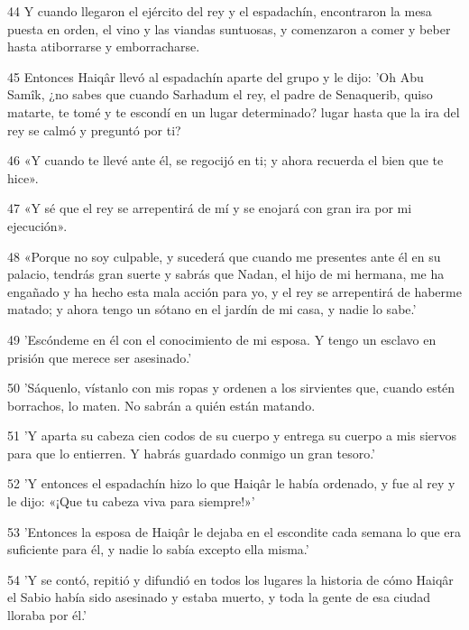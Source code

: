 \par 44 Y cuando llegaron el ejército del rey y el espadachín, encontraron la mesa puesta en orden, el vino y las viandas suntuosas, y comenzaron a comer y beber hasta atiborrarse y emborracharse.

\par 45 Entonces Haiqâr llevó al espadachín aparte del grupo y le dijo: 'Oh Abu Samîk, ¿no sabes que cuando Sarhadum el rey, el padre de Senaquerib, quiso matarte, te tomé y te escondí en un lugar determinado? lugar hasta que la ira del rey se calmó y preguntó por ti?

\par 46 «Y cuando te llevé ante él, se regocijó en ti; y ahora recuerda el bien que te hice».

\par 47 «Y sé que el rey se arrepentirá de mí y se enojará con gran ira por mi ejecución».

\par 48 «Porque no soy culpable, y sucederá que cuando me presentes ante él en su palacio, tendrás gran suerte y sabrás que Nadan, el hijo de mi hermana, me ha engañado y ha hecho esta mala acción para yo, y el rey se arrepentirá de haberme matado; y ahora tengo un sótano en el jardín de mi casa, y nadie lo sabe.'

\par 49 'Escóndeme en él con el conocimiento de mi esposa. Y tengo un esclavo en prisión que merece ser asesinado.'

\par 50 'Sáquenlo, vístanlo con mis ropas y ordenen a los sirvientes que, cuando estén borrachos, lo maten. No sabrán a quién están matando.

\par 51 'Y aparta su cabeza cien codos de su cuerpo y entrega su cuerpo a mis siervos para que lo entierren. Y habrás guardado conmigo un gran tesoro.'

\par 52 'Y entonces el espadachín hizo lo que Haiqâr le había ordenado, y fue al rey y le dijo: «¡Que tu cabeza viva para siempre!»'

\par 53 'Entonces la esposa de Haiqâr le dejaba en el escondite cada semana lo que era suficiente para él, y nadie lo sabía excepto ella misma.'

\par 54 'Y se contó, repitió y difundió en todos los lugares la historia de cómo Haiqâr el Sabio había sido asesinado y estaba muerto, y toda la gente de esa ciudad lloraba por él.'

